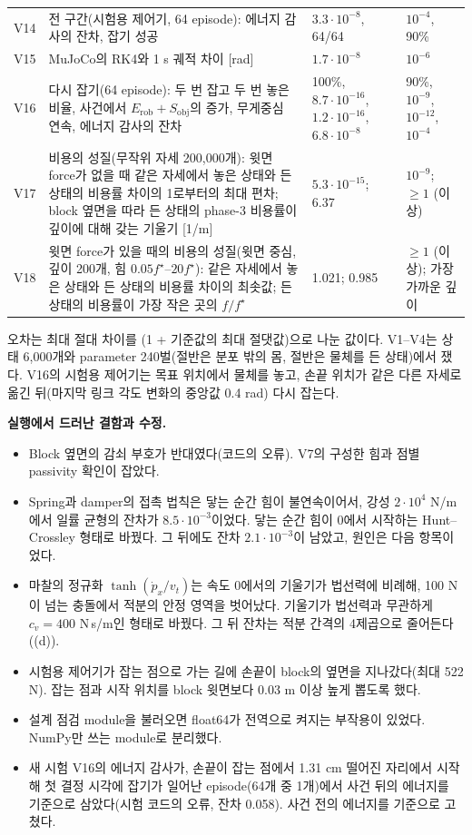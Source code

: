 \documentclass[11pt]{article}\usepackage[margin=1in]{geometry}\usepackage{amsmath,amssymb,amsthm,mathtools}\usepackage{graphicx}\graphicspath{{figures/}{../figures/}{figs/}{./}}\usepackage{enumitem}\usepackage{hyperref}\usepackage{cleveref}\usepackage{tikz}\usetikzlibrary{arrows.meta,positioning,calc,shapes.geometric}\usepackage{float}\usepackage{rotating}\usepackage[most]{tcolorbox}\usepackage{kotex}\usepackage{booktabs}\usepackage{longtable}\emergencystretch=1.6em\tolerance=2000 \crefname{assumption}{Assumption}{Assumptions}\Crefname{assumption}{Assumption}{Assumptions}\crefname{definition}{Definition}{Definitions}\Crefname{definition}{Definition}{Definitions}\crefname{proposition}{Proposition}{Propositions}\Crefname{proposition}{Proposition}{Propositions}\crefname{fact}{Fact}{Facts}\Crefname{fact}{Fact}{Facts} \newtheorem{assumption}{Assumption}\newtheorem{definition}{Definition}\newtheorem{lemma}{Lemma}\newtheorem{proposition}{Proposition}\newtheorem{theorem}{Theorem}\newtheorem{corollary}{Corollary}\newtheorem{fact}{Fact}\theoremstyle{remark}\newtheorem{remark}{Remark} \newcommand{\R}{\mathbb{R}}\newcommand{\xb}{\bar x}\newcommand{\Ab}{\bar A}\newcommand{\By}{\bar B_y}\newcommand{\U}{\mathcal U}\newcommand{\Z}{\mathcal Z}
\begin{document}
\begin{table}[H]
\begin{tabular}{p{0.6cm}p{5.8cm}p{4.9cm}p{3.5cm}}
V14 & 전 구간(시험용 제어기, 64 episode): 에너지 감사의 잔차, 잡기 성공 & $3.3\cdot10^{-8}$, 64/64 & $10^{-4}$, 90\% \\
V15 & MuJoCo의 RK4와 1 s 궤적 차이 [rad] & $1.7\cdot10^{-8}$ & $10^{-6}$ \\
V16 & 다시 잡기(64 episode): 두 번 잡고 두 번 놓은 비율, 사건에서 $E_{\mathrm{rob}}+S_{\mathrm{obj}}$의 증가, 무게중심 연속, 에너지 감사의 잔차 & 100\%, $8.7\cdot10^{-16}$, $1.2\cdot10^{-16}$, $6.8\cdot10^{-8}$ & 90\%, $10^{-9}$, $10^{-12}$, $10^{-4}$ \\
V17 & 비용의 성질(무작위 자세 200{,}000개): 윗면 force가 없을 때 같은 자세에서 놓은 상태와 든 상태의 비용률 차이의 1로부터의 최대 편차; block 옆면을 따라 든 상태의 phase-3 비용률이 깊이에 대해 갖는 기울기 [1/m] & $5.3\cdot10^{-15}$; 6.37 & $10^{-9}$; $\ge1$ (이상) \\
V18 & 윗면 force가 있을 때의 비용의 성질(윗면 중심, 깊이 200개, 힘 $0.05f^\star$--$20f^\star$): 같은 자세에서 놓은 상태와 든 상태의 비용률 차이의 최솟값; 든 상태의 비용률이 가장 작은 곳의 $f/f^\star$ & 1.021; 0.985 & $\ge1$ (이상); 가장 가까운 깊이 \\
\bottomrule
\end{tabular}
\end{table}

오차는 최대 절대 차이를 (1 + 기준값의 최대 절댓값)으로 나눈 값이다. V1--V4는 상태 6{,}000개와 parameter 240벌(절반은 분포 밖의 몸, 절반은 물체를 든 상태)에서 쟀다. V16의 시험용 제어기는 목표 위치에서 물체를 놓고, 손끝 위치가 같은 다른 자세로 옮긴 뒤(마지막 링크 각도 변화의 중앙값 0.4 rad) 다시 잡는다.

\textbf{실행에서 드러난 결함과 수정.}
\begin{itemize}
\item Block 옆면의 감쇠 부호가 반대였다(코드의 오류). V7의 구성한 힘과 점별 passivity 확인이 잡았다.
\item Spring과 damper의 접촉 법칙은 닿는 순간 힘이 불연속이어서, 강성 $2\cdot10^4$ N/m에서 일률 균형의 잔차가 $8.5\cdot10^{-3}$이었다. 닿는 순간 힘이 0에서 시작하는 Hunt--Crossley 형태로 바꿨다. 그 뒤에도 잔차 $2.1\cdot10^{-3}$이 남았고, 원인은 다음 항목이었다.
\item 마찰의 정규화 $\tanh(\dot p_x/v_t)$는 속도 0에서의 기울기가 법선력에 비례해, 100 N이 넘는 충돌에서 적분의 안정 영역을 벗어났다. 기울기가 법선력과 무관하게 $c_v=400$ N\,s/m인 형태로 바꿨다. 그 뒤 잔차는 적분 간격의 4제곱으로 줄어든다((d)).
\item 시험용 제어기가 잡는 점으로 가는 길에 손끝이 block의 옆면을 지나갔다(최대 522 N). 잡는 점과 시작 위치를 block 윗면보다 0.03 m 이상 높게 뽑도록 했다.
\item 설계 점검 module을 불러오면 float64가 전역으로 켜지는 부작용이 있었다. NumPy만 쓰는 module로 분리했다.
\item 새 시험 V16의 에너지 감사가, 손끝이 잡는 점에서 1.31 cm 떨어진 자리에서 시작해 첫 결정 시각에 잡기가 일어난 episode(64개 중 1개)에서 사건 뒤의 에너지를 기준으로 삼았다(시험 코드의 오류, 잔차 0.058). 사건 전의 에너지를 기준으로 고쳤다.
\end{itemize}
\end{document}
